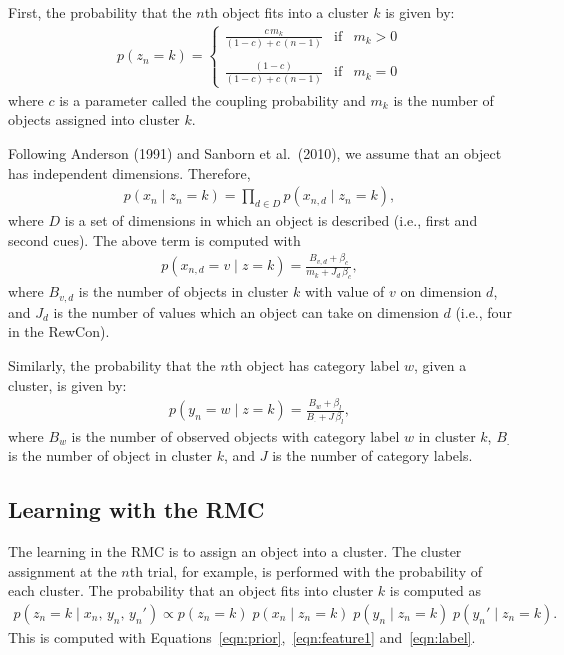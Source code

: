 \documentclass[11pt,a4paper]{article}
\begin{document}
First, the probability that the $n$th object fits into a cluster $k$ is given by:
\begin{align}
    p(z_{n} = k) = \left\{
        \begin{array}{rcl}
            \displaystyle \frac{c\,m_{k}}{(1 - c) + c\,(n - 1)} & \mbox{if} & m_{k} > 0\\
            \\
            \displaystyle \frac{(1 - c)}{(1 - c) + c\,(n - 1)} & \mbox{if} & m_{k} = 0
        \end{array}
    \right.
\label{eqn:prior}
\end{align}
where $c$ is a parameter called the coupling probability and $m_{k}$ is the number of objects
assigned into cluster $k$.

Following Anderson (1991) and Sanborn et al.\ (2010), we assume that an object has independent
dimensions. Therefore,
\begin{align}
    p(x_{n} \; \vert \; z_{n} = k) = \prod_{d \in D} p(x_{n,d} \; \vert \; z_{n} = k),
\label{eqn:feature1}
\end{align}
where $D$ is a set of dimensions in which an object is described (i.e., first and second cues).
The above term is computed with
\begin{align}
    p(x_{n,d} = v \; \vert \; z = k) = \frac{B_{v,d} + \beta_{c}}{m_{k} + J_{d} \, \beta_{c}},
\label{eqn:feature2}
\end{align}
where $B_{v,d}$ is the number of objects in cluster $k$ with value of $v$ on dimension $d$, and
$J_{d}$ is the number of values which an object can take on dimension $d$ (i.e., four in the
RewCon).

Similarly, the probability that the $n$th object has category label $w$, given a cluster, is given by:
\begin{align}
    p(y_{n} = w \; \vert \; z = k) = \frac{B_{w} + \beta_{l}}{B_{.} + J \, \beta_{l}},
\label{eqn:label}
\end{align}
where $B_{w}$ is the number of observed objects with category label $w$ in cluster $k$, $B_{.}$ is
the number of object in cluster $k$, and $J$ is the number of category labels.


\subsection{Learning with the RMC}

The learning in the RMC is to assign an object into a cluster. The cluster assignment at the $n$th
trial, for example, is performed with the probability of each cluster. The probability that an
object fits into cluster $k$ is computed as
\begin{align}
    p(z_{n} = k \;\vert\; x_{n},\, y_{n},\, y_{n}') \propto
    p(z_{n} = k)
    \;
    p(x_{n} \;\vert\; z_{n} = k)
    \;
    p(y_{n} \;\vert\; z_{n} = k)
    \;
    p(y_{n}' \;\vert\; z_{n} = k).
\label{eqn:learning}
\end{align}
This is computed with Equations~\ref{eqn:prior},~\ref{eqn:feature1} and~\ref{eqn:label}.
\end{document}
